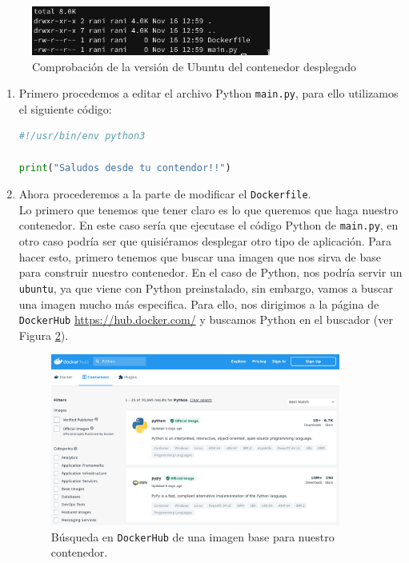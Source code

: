 \documentclass[a4paper, oneside, 12pt]{book}
\begin{document}
	\begin{figure}[h]
		\begin{center}
			\includegraphics[width=0.7\textwidth]{img/dockerfile_folder.png}
			\caption{Comprobación de la versión de Ubuntu del contenedor desplegado}
			\label{img: docker file folder}
		\end{center}
	\end{figure}
	
	\begin{enumerate}
		\item Primero procedemos a editar el archivo Python \texttt{main.py}, para ello utilizamos el siguiente código:
		\begin{lstlisting}[language=Python, caption=Codigo Python de ejemplo para crear un Dockerfile]
#!/usr/bin/env python3

print("Saludos desde tu contendor!!")
		\end{lstlisting}
	
		\item Ahora procederemos a la parte de modificar el \texttt{Dockerfile}. \\
		
		\noindent Lo primero que tenemos que tener claro es lo que queremos que haga nuestro contenedor. En este caso sería que ejecutase el código Python de \texttt{main.py}, en otro caso podría ser que quisiéramos desplegar otro tipo de aplicación. Para hacer esto, primero tenemos que buscar una imagen que nos sirva de base para construir nuestro contenedor. En el caso de Python, nos podría servir un \texttt{ubuntu}, ya que viene con Python preinstalado, sin embargo, vamos a buscar una imagen mucho más especifica. Para ello, nos dirigimos a la página de \texttt{DockerHub} \url{https://hub.docker.com/} y buscamos Python en el buscador (ver Figura \ref{img: dockerhub python}).
	
	\pagebreak
	
	\begin{figure}[h]
		\begin{center}
			\includegraphics[width=0.9\textwidth]{img/dockerhub_python.png}
			\caption{Búsqueda en \texttt{DockerHub} de una imagen base para nuestro contenedor.}
			\label{img: dockerhub python}
		\end{center}
	\end{figure}
	

\end{enumerate}
\end{document}

